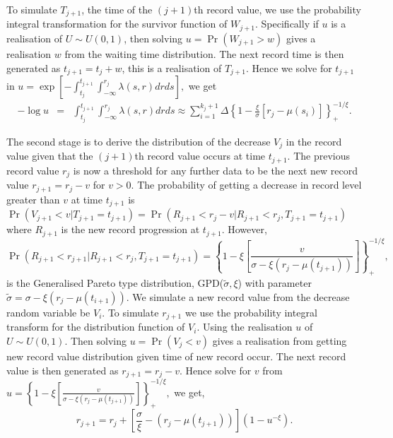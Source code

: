 \documentclass[10pt]{article}
\begin{document}
To simulate $T_{j+1}$, the time of the $(j+1)$th record value,
we use the probability integral transformation
for the survivor function of $W_{j+1}$. Specifically if $u$ is a
realisation of $U \sim U(0,1)$, then solving  $ u=\Pr(W_{j+1}>w)$
gives a realisation $w$ from the waiting time distribution. The next
record time is then generated as $t_{j+1}=t_j+w$, this is a
realisation of $T_{j+1}$. Hence we solve for
$t_{j+1}$ in 
$
  u = \exp \left [-\int^{t_{j+1}}_{t_j} \int^{r_j}_{-\infty} \lambda(s,r) dr ds\right],
$
we get
\begin{eqnarray}
  \label{eq:twoA}
   -\log u & = & \int_{t_{j}}^{t_{j+1}} \int^{r_{j}}_{-\infty} \lambda(s,r) dr ds   \approx  \sum^{k_{j}+1}_{i=1}\varDelta 
\left \{1-\frac{\xi}{\sigma}[r_{j}-\mu(s_i)]\right\}^{-1/\xi}_+.
\end{eqnarray}

The second stage is to derive the distribution of the decrease $V_j$ in the
record value given that the $(j+1)$th record value occurs at time $t_{j+1}$.
The previous record value $r_j$ is now a threshold
for any further data to be the next new record value $r_{j+1}=r_j-v$
for $v>0$. The probability of getting a decrease in record level
greater than $v$ at time $t_{j+1}$ is 
$
\Pr(V_{j+1}<v |T_{j+1}=t_{j+1})=  \Pr(R_{j+1} < r_{j}-v |R_{j+1}< r_j,
T_{j+1}=t_{j+1})
$
where $R_{j+1}$ is the new record progression at $t_{j+1}$. However,
\[
    \Pr(R_{j+1} < r_{j+1}|R_{j+1}< r_j, T_{j+1}=t_{j+1})%
 =  \left\{1-\xi \left[ \frac{v}{\sigma - \xi(r_j-\mu(t_{j+1}))}
    \right]\right\}^{-1/\xi}_+,\]
is the Generalised Pareto type distribution,
GPD($\tilde{\sigma},\xi$) with parameter  $ \tilde{\sigma} = \sigma -
\xi(r_j - \mu(t_{i+1})).$ We simulate a new record value from the decrease
random variable be $V_i$. To simulate $r_{j+1}$ we use the probability
integral transform for the distribution function of $V_i$. Using the
realisation $u$ of  $U \sim U(0,1)$. Then solving $ u= \Pr(V_j < v) $
gives a realisation from getting new record value distribution given
 time of new record occur. The next record value is then 
 generated as $r_{j+1} = r_{j} - v$. Hence solve for $v$ from
 $    u =  \left\{1-\xi \left[ \frac{v}{\sigma - \xi(r_j-\mu(t_{j+1}))}
    \right]\right\}^{-1/\xi}_+,$
we get,    
\begin{equation}
  \label{eq:threeB}
  r_{j+1} = r_{j} + \left[\frac{\sigma}{\xi}-(r_{j}-\mu(t_{j+1}))\right](1-u^{-\xi}).
\end{equation}
\end{document}
